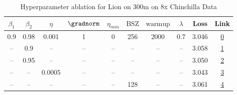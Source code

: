 \begin{table}[H]
\centering
\caption{Hyperparameter ablation for Lion on 300m on 8x Chinchilla Data}
\label{tab:ablation_lion_300m_on_8x_chinchilla_data}
\begin{tabular}{cccccccccc}
\toprule
$\beta_1$ & $\beta_2$ & $\eta$ & $\gradnorm$ & $\eta_{min}$ & $\mathrm{BSZ}$ & $\mathrm{warmup}$ & $\lambda$ & Loss & Link \\
\midrule
0.9 & 0.98 & 0.001 & 1 & 0 & 256 & 2000 & 0.7 & 3.046 & \href{https://wandb.ai/stanford-mercury/optimizer-scaling/runs/sweep-300m-48B-lioneb1a25lr0.001-wd0.7-minlr0-warmup2000-b10.9-b-2006af}{0} \\
\midrule
-- & 0.9 & -- & -- & -- & -- & -- & -- & 3.058 & \href{https://wandb.ai/stanford-mercury/optimizer-scaling/runs/sweep-300m-48B-lion2962dblr0.001-wd0.7-minlr0-warmup2000-b10.9-b-5ec1df}{1} \\
-- & 0.95 & -- & -- & -- & -- & -- & -- & 3.050 & \href{https://wandb.ai/stanford-mercury/optimizer-scaling/runs/sweep-300m-48B-lion2842d8lr0.001-wd0.7-minlr0-warmup2000-b10.9-b-df0b7e}{2} \\
-- & -- & 0.0005 & -- & -- & -- & -- & -- & 3.043 & \href{https://wandb.ai/stanford-mercury/optimizer-scaling/runs/sweep-300m-48B-lion698f3blr0.0005-wd0.7-minlr0-warmup2000-b10.9--6f8954}{3} \\
-- & -- & -- & -- & -- & 128 & -- & -- & 3.061 & \href{https://wandb.ai/stanford-mercury/optimizer-scaling/runs/sweep-300m-48B-lion875c0alr0.001-wd0.7-minlr0-warmup2000-b10.9-b-a1a7a1}{4} \\
\bottomrule
\end{tabular}
\end{table}

